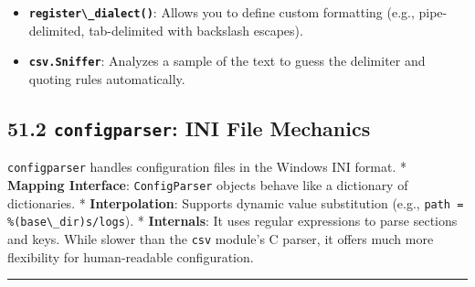 \begin{itemize}
\tightlist
\item
  \textbf{\passthrough{\lstinline!register\_dialect()!}}: Allows you to
  define custom formatting (e.g., pipe-delimited, tab-delimited with
  backslash escapes).
\item
  \textbf{\passthrough{\lstinline!csv.Sniffer!}}: Analyzes a sample of
  the text to guess the delimiter and quoting rules automatically.
\end{itemize}

\hypertarget{configparser-ini-file-mechanics}{%
\subsection{\texorpdfstring{51.2 \texttt{configparser}: INI File
Mechanics}{51.2 configparser: INI File Mechanics}}\label{configparser-ini-file-mechanics}}

\passthrough{\lstinline!configparser!} handles configuration files in
the Windows INI format. * \textbf{Mapping Interface}:
\passthrough{\lstinline!ConfigParser!} objects behave like a dictionary
of dictionaries. * \textbf{Interpolation}: Supports dynamic value
substitution (e.g.,
\passthrough{\lstinline!path = \%(base\_dir)s/logs!}). *
\textbf{Internals}: It uses regular expressions to parse sections and
keys. While slower than the \passthrough{\lstinline!csv!} module's C
parser, it offers much more flexibility for human-readable
configuration.

\begin{center}\rule{0.5\linewidth}{0.5pt}\end{center}
